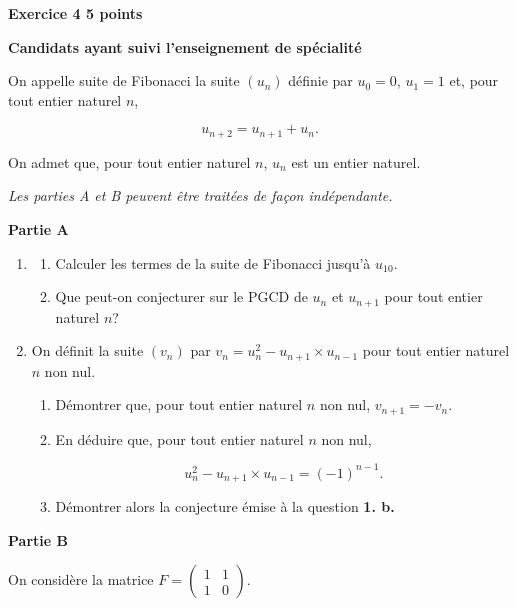 \documentclass[10pt,a4paper]{article}
\begin{document}
\vspace{0,25cm}

\textbf{Exercice 4 \hfill 5 points}

\medskip

\textbf{Candidats ayant suivi l'enseignement de spécialité}

\bigskip

On appelle suite de Fibonacci la suite $\left(u_n\right)$ définie par $u_0=0$, $u_1=1$ et, pour tout entier naturel $n$,

\[u_{n+2} = u_{n+1} + u_{n}.\]

On admet que, pour tout entier naturel $n$, $u_n$ est un entier naturel.

\smallskip

\emph{Les parties \emph{A} et \emph{B} peuvent être traitées de façon indépendante.}

\bigskip

\textbf{Partie A}

\medskip

\begin{enumerate}
\item 
	\begin{enumerate}
		\item Calculer les termes de la suite de Fibonacci jusqu'à $u_{10}$.
		\item Que peut-on conjecturer sur le PGCD de $u_{n}$ et $u_{n+1}$ pour tout entier naturel $n$?
	\end{enumerate}

\item On définit la suite $\left(v_n\right)$ par $v_n = u_n^2 - u_{n+1}\times u_{n-1}$ pour tout entier naturel $n$ non nul.
	\begin{enumerate}
		\item Démontrer que, pour tout entier naturel $n$ non nul, $v_{n+1} = -v_n$.
		\item En déduire que, pour tout entier naturel $n$ non nul,

\[u_n^2 - u_{n+1}\times u_{n-1} = \left (-1\right )^{n-1}.\]

		\item Démontrer alors la conjecture émise à la question \textbf{1. b.}
	\end{enumerate}
\end{enumerate}

\bigskip

\textbf{Partie B}

\medskip

On considère la matrice
$F=\begin{pmatrix} 1 & 1 \\ 1 & 0\end{pmatrix}$.
\end{document}
